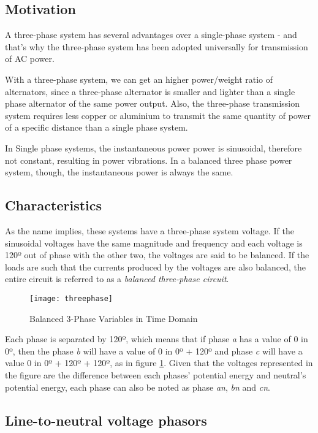 \subsection{Motivation}

A three-phase system has several advantages over a single-phase system - and that's why the three-phase system has been adopted universally for transmission of AC power.

With a three-phase system, we can get an higher power/weight ratio of alternators, since a three-phase alternator is smaller and lighter than a single phase alternator of the same power output. Also, the three-phase transmission system  requires less copper or aluminium to transmit the same quantity of power of a specific distance than a single phase system.

In Single phase systems, the instantaneous power power is sinusoidal, therefore not constant, resulting in power vibrations. In a balanced three phase power system, though, the instantaneous power is always the same.

\subsection{Characteristics}

As the name implies, these systems have a three-phase system voltage. If the sinusoidal voltages have the same magnitude and frequency and each voltage is 120º out of phase with the other two, the voltages are said to be balanced. If the loads are such that the currents produced by the voltages are also balanced, the entire circuit is referred to as a \emph{balanced three-phase circuit}.

\begin{figure}[htbp]
	\centering
	\texttt{[image: threephase]}
	\caption{Balanced 3-Phase Variables in Time Domain}
	\label{fig:balanced_tp_time_domain}
\end{figure}

Each phase is separated by 120º, which means that if phase \emph{a} has a value of 0 in 0º, then the phase \emph{b} will have a value of 0 in 0º + 120º and phase \emph{c} will have a value 0 in 0º + 120º + 120º, as in figure \ref{fig:balanced_tp_time_domain}. Given that the voltages represented in the figure are the difference between each phases' potential energy and neutral's potential energy, each phase can also be noted as phase \emph{an}, \emph{bn} and \emph{cn}.

\subsection{Line-to-neutral voltage phasors}

